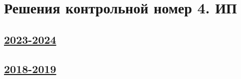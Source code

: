 \thispagestyle{empty}
\section{Решения контрольной номер 4. ИП}

\subsection[2023-2024]{\hyperref[sec:kr_04_ip_2023_2024]{2023-2024}}
\label{sec:sol_kr_04_ip_2023_2024}


\subsection[2018-2019]{\hyperref[sec:kr_04_ip_2018_2019]{2018-2019}}
\label{sec:sol_kr_04_ip_2018_2019}
